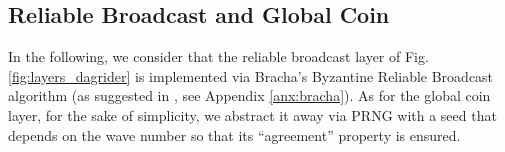 

\subsection{Reliable Broadcast and Global Coin}

In the following, we consider that the reliable broadcast layer of Fig.\ref{fig:layers_dagrider} is implemented via Bracha's Byzantine Reliable Broadcast algorithm \cite{asynchronous_byzantine_agreement_protocols} (as suggested in \cite{bullshark}, see Appendix \ref{anx:bracha}).
As for the global coin layer, for the sake of simplicity, we abstract it away via PRNG with a seed that depends on the wave number so that its ``agreement'' property \cite{all_you_need_is_dag} is ensured.
